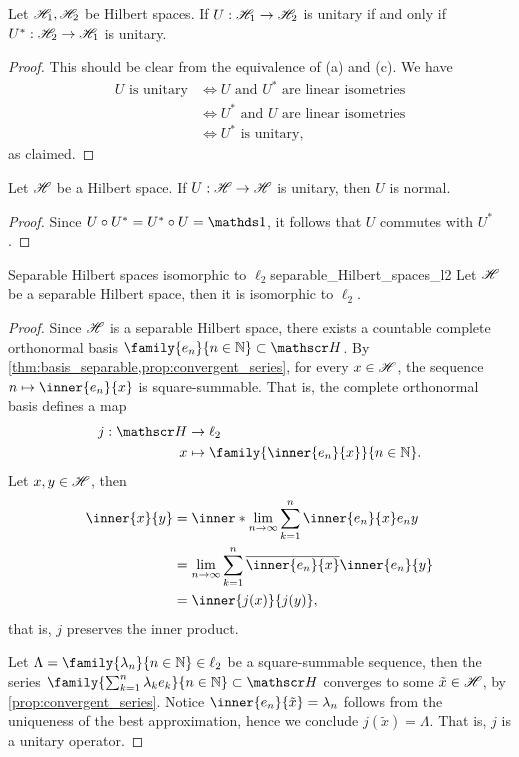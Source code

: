 \begin{corollary}
    Let \(\mathscr{H}_1, \mathscr{H}_2\) be Hilbert spaces. If \(U : \mathscr{H}_1 \to \mathscr{H}_2\) is unitary if and only if \(U^* : \mathscr{H}_2 \to \mathscr{H}_1\) is unitary.
\end{corollary}
\begin{proof}
    This should be clear from the equivalence of (a) and (c). We have
    \begin{align*}
        U \text{ is unitary} &\iff U\text{ and }U^*\text{ are linear isometries} \\
                             &\iff U^*\text{ and }U\text{ are linear isometries}\\
                             &\iff U^*\text{ is unitary},
    \end{align*}
    as claimed.
\end{proof}
\begin{corollary}
    Let \(\mathscr{H}\) be a Hilbert space. If \(U : \mathscr{H} \to \mathscr{H}\) is unitary, then \(U\) is normal.
\end{corollary}
\begin{proof}
    Since \(U \circ U^* = U^* \circ U = \unity\), it follows that \(U\) commutes with \(U^*\).
\end{proof}

\begin{theorem}{Separable Hilbert spaces isomorphic to \(\ell_2\)}{separable_Hilbert_spaces_l2}
    Let \(\mathscr{H}\) be a separable Hilbert space, then it is isomorphic to \(\ell_2\).
\end{theorem}
\begin{proof}
    Since \(\mathscr{H}\) is a separable Hilbert space, there exists a countable complete orthonormal basis \(\family{e_n}{n\in \mathbb{N}}\subset \hilbert\). By \cref{thm:basis_separable,prop:convergent_series}, for every \(x \in \mathscr{H}\), the sequence \(n \mapsto \inner{e_n}{x}\) is square-summable. That is, the complete orthonormal basis defines a map
    \begin{align*}
        j : \hilbert &\to \ell_2\\
                   x &\mapsto \family{\inner{e_n}{x}}{n \in \mathbb{N}}.
    \end{align*}
    Let \(x, y \in \mathscr{H}\), then
    \begin{align*}
        \inner{x}{y} &= \inner*{\lim_{n \to \infty}\sum_{k = 1}^n \inner{e_n}{x}e_n}{y}\\
                     &= \lim_{n \to \infty} \sum_{k=1}^n \conj{\inner{e_n}{x}} \inner{e_n}{y}\\
                     &= \inner{j(x)}{j(y)},
    \end{align*}
    that is, \(j\) preserves the inner product.

    Let \(\Lambda = \family{\lambda_n}{n \in \mathbb{N}} \in \ell_2\) be a square-summable sequence, then the series \(\family{\sum_{k = 1}^n \lambda_k e_k}{n \in \mathbb{N}} \subset \hilbert\) converges to some \(\tilde{x} \in \mathscr{H}\), by \cref{prop:convergent_series}. Notice \(\inner{e_n}{\tilde{x}} = \lambda_n\) follows from the uniqueness of the best approximation, hence we conclude \(j(\tilde{x}) = \Lambda\). That is, \(j\) is a unitary operator.
\end{proof}
